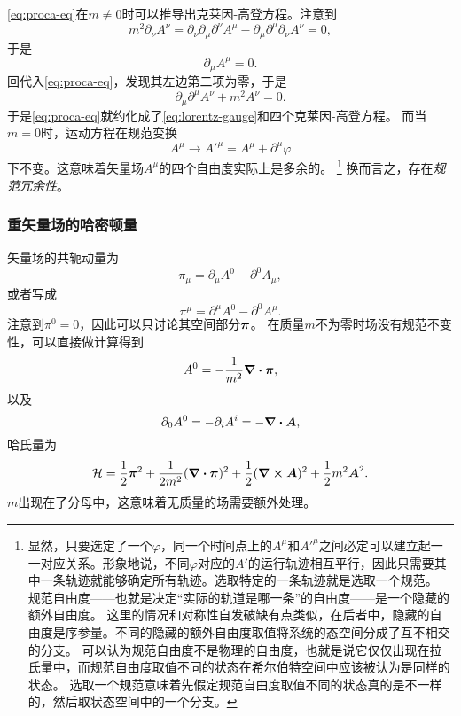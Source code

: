 \eqref{eq:proca-eq}在$m \neq 0$时可以推导出克莱因-高登方程。注意到
\[
    m^2 \partial_\nu A^\nu = \partial_\nu \partial_\mu \partial^\nu A^\mu - \partial_\mu \partial^\mu \partial_\nu A^\nu = 0,
\]
于是
\begin{equation}
    \partial_\mu A^\mu = 0.
    \label{eq:lorentz-gauge}
\end{equation}
回代入\eqref{eq:proca-eq}，发现其左边第二项为零，于是
\[
    \partial_\mu \partial^\mu A^\nu + m^2 A^\nu = 0.
\]
于是\eqref{eq:proca-eq}就约化成了\eqref{eq:lorentz-gauge}和四个克莱因-高登方程。
而当$m=0$时，运动方程在规范变换
\begin{equation}
    A^\mu \longrightarrow {A'}^\mu = A^\mu + \partial^\mu \varphi
\end{equation}
下不变。这意味着矢量场$A^\mu$的四个自由度实际上是多余的。%
\footnote{显然，只要选定了一个$\varphi$，同一个时间点上的$A^\mu$和${A'}^\mu$之间必定可以建立起一一对应关系。形象地说，不同$\varphi$对应的$A'$的运行轨迹相互平行，因此只需要其中一条轨迹就能够确定所有轨迹。选取特定的一条轨迹就是选取一个规范。
规范自由度——也就是决定“实际的轨道是哪一条”的自由度——是一个隐藏的额外自由度。
这里的情况和对称性自发破缺有点类似，在后者中，隐藏的自由度是序参量。不同的隐藏的额外自由度取值将系统的态空间分成了互不相交的分支。
可以认为规范自由度不是物理的自由度，也就是说它仅仅出现在拉氏量中，而规范自由度取值不同的状态在希尔伯特空间中应该被认为是同样的状态。
选取一个规范意味着先假定规范自由度取值不同的状态真的是不一样的，然后取状态空间中的一个分支。}%
换而言之，存在\emph{规范冗余性}。

\subsubsection{重矢量场的哈密顿量}

矢量场的共轭动量为
\[
    \pi_\mu = \partial_\mu A^0 - \partial^0 A_\mu,
\]
或者写成
\begin{equation}
    \pi^\mu = \partial^\mu A^0 - \partial^0 A^\mu.
\end{equation}
注意到$\pi^0 = 0$，因此可以只讨论其空间部分$\vb*{\pi}$。
在质量$m$不为零时场没有规范不变性，可以直接做计算得到
\begin{equation}
    A^0 = - \frac{1}{m^2} \div{\vb*{\pi}},
\end{equation}
以及
\begin{equation}
    \partial_0 A^0 = - \partial_i A^i = - \div{\vb*{A}},
\end{equation}
哈氏量为
\begin{equation}
    \mathcal{H} = \frac{1}{2} \vb*{\pi}^2 + \frac{1}{2m^2} (\div{\vb*{\pi}})^2 + \frac{1}{2} (\curl{\vb*{A}})^2 + \frac{1}{2} m^2 \vb*{A}^2.
\end{equation}
$m$出现在了分母中，这意味着无质量的场需要额外处理。

